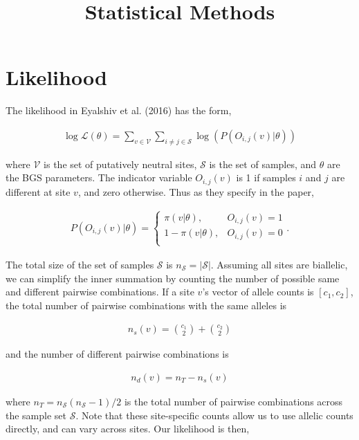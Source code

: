 \documentclass[11pt]{article}
\title{Statistical Methods}
\begin{document}
\maketitle


\section*{Likelihood}

The likelihood in Eyalshiv et al. (2016) has the form,

\begin{align}
  \log\mathcal{L}(\theta) = \sum_{v \in \mathcal{V}} \sum_{i \ne j \in \mathcal{S}} \log(P(O_{i,j}(v) | \theta))
\end{align}

where $\mathcal{V}$ is the set of putatively neutral sites, $\mathcal{S}$ is
the set of samples, and $\theta$ are the BGS parameters. The indicator variable
$O_{i,j}(v)$ is 1 if samples $i$ and $j$ are different at site $v$, and zero
otherwise. Thus as they specify in the paper, 

\begin{align}
  P(O_{i,j}(v) | \theta) = 
    \begin{cases}
      \pi(v | \theta), & O_{i,j}(v) = 1 \\
      1-\pi(v | \theta), & O_{i,j}(v) = 0 \\
    \end{cases}.
\end{align}

The total size of the set of samples $\mathcal{S}$ is $n_\mathcal{S} =
|\mathcal{S}|$. Assuming all sites are biallelic, we can simplify the inner
summation by counting the number of possible same and different pairwise
combinations. If a site $v$'s vector of allele counts is $[c_1, c_2]$, the
total number of pairwise combinations with the same alleles is

\begin{align}
  n_s(v) = {c_1 \choose 2} + {c_2 \choose 2}
\end{align}

and the number of different pairwise combinations is 

\begin{align}
  n_d(v) = n_T - n_s(v)
\end{align}

where $n_T = n_\mathcal{S} (n_\mathcal{S} - 1) / 2$  is the total number of
pairwise combinations across the sample set $\mathcal{S}$. Note that these
site-specific counts allow us to use allelic counts directly, and can vary
across sites. Our likelihood is then,
\end{document}
